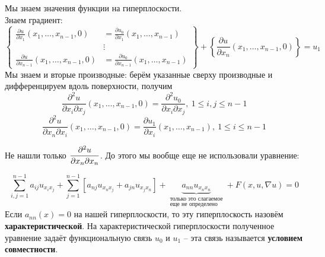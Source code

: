 \documentclass[../main.tex]{subfiles}
\begin{document}
Мы знаем значения функции на гиперплоскости.\\
Знаем градиент:
\begin{equation*}
\left\{\begin{aligned}
\frac{\partial u}{\partial x_1}(x_1, \dots, x_{n-1}, 0) &= \frac{\partial u_0}{\partial x_1}(x_1, \dots, x_{n-1})\\ 
&\vdots \\
\frac{\partial u}{\partial x_{n-1}}(x_1, \dots, x_{n-1}, 0) &= \frac{\partial u_0}{\partial x_{n-1}}(x_1, \dots, x_{n-1})
\end{aligned} \right\}
+\left\{\frac{\partial u}{\partial x_n}(x_1,\dots,x_{n-1},0)\right\} = u_1
\end{equation*}
Мы знаем и вторые производные: берём указанные сверху производные и дифференцируем вдоль поверхности, получим \[\frac{\partial^2u}{\partial x_i\partial x_j}(x_1,\dots,x_{n-1}, 0) = \frac{\partial^2u_0}{\partial x_i\partial x_j},\ 1\le i,j \le n-1 \]
\[\frac{\partial^2u}{\partial x_n\partial x_i}(x_1,\dots,x_{n-1}, 0) = \frac{\partial u_1}{\partial x_i}(x_1,\dots,x_{n-1}),\ 1\le i\le n-1\]

Не нашли только $\displaystyle\frac{\partial^2 u}{\partial x_n\partial x_n}$. До этого мы вообще еще не использовали уравнение:

$$\displaystyle\sum\limits_{i,j=1}^{n-1}a_{ij}u_{x_ix_j} + \displaystyle\sum\limits_{j=1}^{n-1}\left[a_{nj}u_{x_nx_j} + a_{jn}u_{x_jx_n}\right] + \underbrace{a_{nn}u_{x_nx_n}}_{\substack{\text{только это слагаемое}\\ \text{еще не определено}}} + F(x, u, \nabla u) = 0 $$
Если $a_{nn}(x) = 0$ на нашей гиперплоскости, то эту гиперплоскость назовём {\bf характеристической}. На характеристической гиперплоскости полученное уравнение задаёт функциональную связь $u_0$ и $u_1$ -- эта связь называется {\bf условием совместности}.
\end{document}
